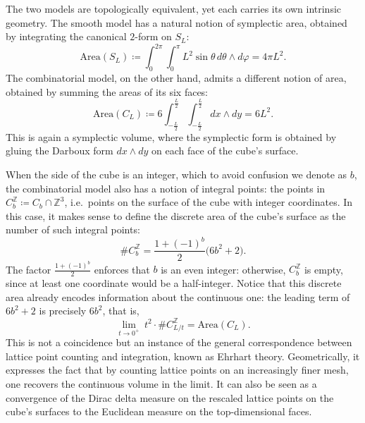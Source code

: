\documentclass[a4paper,11pt,english]{article}
\theoremstyle{plain}
\theoremstyle{definition}
\theoremstyle{plain}
\newcommand{\Z}{\mathbb{Z}}
\begin{document}
The two models are topologically equivalent, yet each carries its own intrinsic geometry. 
The smooth model has a natural notion of symplectic area, obtained by integrating the canonical $2$-form on $S_L$:
\begin{equation}
    \mathrm{Area}(S_L)
    \coloneqq
    \int_{0}^{2\pi} \int_{0}^{\pi} L^2 \sin\theta \, d\theta \wedge d\varphi
    = 4\pi L^2.
\end{equation}
The combinatorial model, on the other hand, admits a different notion of area, obtained by summing the areas of its six faces:
\begin{equation}
    \mathrm{Area}(C_L)
    \coloneqq
    6
    \int_{-\frac{L}{2}}^{\frac{L}{2}} \int_{-\frac{L}{2}}^{\frac{L}{2}}
        dx \wedge dy
    =
    6 L^2.
\end{equation}
This is again a symplectic volume, where the symplectic form is obtained by gluing the Darboux form $dx \wedge dy$ on each face of the cube's surface.

When the side of the cube is an integer, which to avoid confusion we denote as $b$, the combinatorial model also has a notion of integral points: the points in $C_b^{\Z} \coloneqq C_b \cap \Z^3$, i.e.~points on the surface of the cube with integer coordinates. In this case, it makes sense to define the discrete area of the cube's surface as the number of such integral points:
\begin{equation}
    \# C_b^{\Z}
    =
    \frac{1 + (-1)^b}{2}
    \bigl(
        6 b^2 + 2
    \bigr).
\end{equation}
The factor $\frac{1 + (-1)^b}{2}$ enforces that $b$ is an even integer: otherwise, $C_b^{\Z}$ is empty, since at least one coordinate would be a half-integer.  
Notice that this discrete area already encodes information about the continuous one: the leading term of $6b^2 + 2$ is precisely $6b^2$, that is,
\begin{equation}
    \lim_{t \to 0^+} \
        t^{2} \cdot \# C_{L/t}^{\Z}
    =
    \mathrm{Area}(C_L) .
\end{equation}
This is not a coincidence but an instance of the general correspondence between lattice point counting and integration, known as Ehrhart theory. Geometrically, it expresses the fact that by counting lattice points on an increasingly finer mesh, one recovers the continuous volume in the limit. It can also be seen as a convergence of the Dirac delta measure on the rescaled lattice points on the cube's surfaces to the Euclidean measure on the top-dimensional faces.
\end{document}
